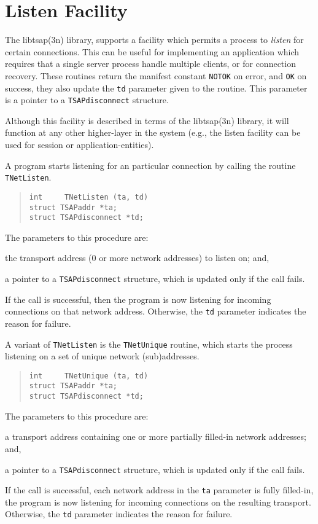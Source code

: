 \section	{Listen Facility}\label{tsap:listen}
The \man libtsap(3n) library,
supports a facility which permits a process to {\em listen\/} for certain
connections.
This can be useful for implementing an application which requires that a
single server process handle multiple clients,
or for connection recovery.
These routines return the manifest constant \verb"NOTOK" on error,
and \verb"OK" on success,
they also update the \verb"td" parameter given to the routine.
This parameter is a pointer to a \verb"TSAPdisconnect" structure.

Although this facility is described in terms of the \man libtsap(3n) library,
it will function at any other higher-layer in the system
(e.g., the listen facility can be used for session or application-entities).

A program starts listening for an particular connection by calling the routine
\verb"TNetListen".
\begin{quote}\small\begin{verbatim}
int     TNetListen (ta, td)
struct TSAPaddr *ta;
struct TSAPdisconnect *td;
\end{verbatim}\end{quote}
The parameters to this procedure are:
\begin{describe}
\item[\verb"ta":] the transport address (0 or more network addresses)
to listen on; and,

\item[\verb"td":] a pointer to a \verb"TSAPdisconnect" structure,
which is updated only if the call fails.
\end{describe}
If the call is successful,
then the program is now listening for incoming connections on that network
address.
Otherwise,
the \verb"td" parameter indicates the reason for failure.

A variant of \verb"TNetListen" is the \verb"TNetUnique" routine,
which starts the process listening on a set of unique network (sub)addresses.
\begin{quote}\small\begin{verbatim}
int     TNetUnique (ta, td)
struct TSAPaddr *ta;
struct TSAPdisconnect *td;
\end{verbatim}\end{quote}
The parameters to this procedure are:
\begin{describe}
\item[\verb"ta":] a transport address containing  one or more partially
filled-in network addresses; and,

\item[\verb"td":] a pointer to a \verb"TSAPdisconnect" structure,
which is updated only if the call fails.
\end{describe}
If the call is successful,
each network address in the \verb"ta" parameter is fully filled-in,
the program is now listening for incoming connections on the resulting
transport.
Otherwise,
the \verb"td" parameter indicates the reason for failure.


